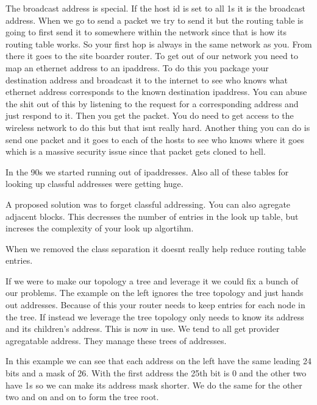 \documentclass[12pt]{article}
\begin{document}

The broadcast address is special. If the host id is set to all 1s it is the broadcast address. When we go to send a packet we try to send it but the routing table is going to first send it to somewhere within the network since that is how its routing table works. So your first hop is always in the same network as you. From there it goes to the site boarder router. To get out of our network you need to map an ethernet address to an ipaddress. To do this you package your destination address and broadcast it to the internet to see who knows what ethernet address corresponds to the known destination ipaddress. You can abuse the shit out of this by listening to the request for a corresponding address and just respond to it. Then you get the packet. You do need to get access to the wireless network to do this but that isnt really hard. Another thing you can do is send one packet and it goes to each of the hosts to see who knows where it goes which is a massive security issue since that packet gets cloned to hell. 

 
In the 90s we started running out of ipaddresses. Also all of these tables for looking up classful addresses were getting huge.


A proposed solution was to forget classful addressing. You can also agregate adjacent blocks. This decresses the number of entries in the look up table, but increses the complexity of your look up algortihm.


When we removed the class separation it doesnt really help reduce routing table entries. 


If we were to make our topology a tree and leverage it we could fix a bunch of our problems. The example on the left ignores the tree topology and just hands out addresses. Because of this your router needs to keep entries for each node in the tree. If instead we leverage the tree topology only needs to know its address and its children's address. This is now in use. We tend to all get provider agregatable address. They manage these trees of addresses. 


In this example we can see that each address on the left have the same leading 24 bits and a mask of 26. With the first address the 25th bit is 0 and the other two have 1s so we can make its address mask shorter. We do the same for the other two and on and on to form the tree root. 
\end{document}

